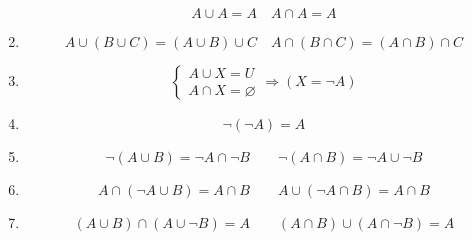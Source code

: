 \documentclass[a4paper, 12pt, oneside, titlepage, BCOR=1mm, DIV=12]{scrreprt}
\let\emptyset\varnothing
\begin{document}
\begin{enumerate}
      \begin{displaymath}
        A\cup{A} = A \quad A\cap{A} = A
      \end{displaymath}

    \item \normalsize{}

      \begin{displaymath}
        A\cup{(B\cup{C})}=(A\cup{B})\cup{C} \quad A\cap{(B\cap{C})} = (A\cap{B})\cap{C}
      \end{displaymath}

    \item \normalsize{}
      \begin{displaymath}
        \left\{\begin{array}{l}
            A \cup{X} = U \\
            A \cap{X} = \emptyset
            \end{array} \Rightarrow (X = \neg{A})
      \end{displaymath}

    \item \normalsize{}
      \begin{displaymath}
        \neg{(\neg{A})} = A
      \end{displaymath}

    \item \normalsize{}
      \begin{displaymath}
        \neg{(A\cup{B})} = \neg{A}\cap{\neg{B}} \qquad \neg{(A\cap{B})} = \neg{A}\cup{\neg{B}}
      \end{displaymath}

    \item \normalsize{}
      \begin{displaymath}
        A\cap{(\neg{A}\cup{B})}=A\cap{B} \qquad A\cup{(\neg{A}\cap{B})}=A\cap{B}
      \end{displaymath}

    \item \normalsize{}
      \begin{displaymath}
        (A\cup{B})\cap{(A\cup{\neg{B}})} = A \qquad    (A\cap{B})\cup{(A\cap{\neg{B}})} = A
      \end{displaymath}

  \end{enumerate}
\end{document}
